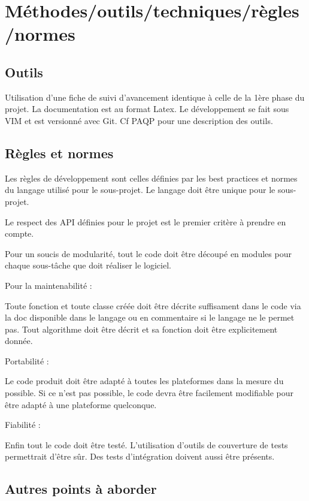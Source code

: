 \section{Méthodes/outils/techniques/règles/normes}

\subsection{Outils}
Utilisation d'une fiche de suivi d'avancement identique à celle de la 1ère 
phase du projet.
La documentation est au format Latex.
Le développement se fait sous VIM et est versionné avec Git.
Cf PAQP pour une description des outils.

\subsection{Règles et normes}
Les règles de développement sont celles définies par les best practices et 
normes du langage utilisé pour le sous-projet.
Le langage doit être unique pour le sous-projet.

Le respect des API définies pour le projet est le premier critère à prendre en 
compte.

Pour un soucis de modularité, tout le code doit être découpé en modules pour
chaque sous-tâche que doit réaliser le logiciel.

Pour la maintenabilité :

Toute fonction et toute classe créée doit être décrite suffisament dans le code 
via la doc disponible dans le langage ou en commentaire si le langage ne le
permet pas. 
Tout algorithme doit être décrit et sa fonction doit être explicitement donnée.

Portabilité :

Le code produit doit être adapté à toutes les plateformes dans la mesure du 
possible. Si ce n'est pas possible, le code devra être facilement modifiable 
pour être adapté à une plateforme quelconque.

Fiabilité :

Enfin tout le code doit être testé. L'utilisation d'outils de 
couverture de tests permettrait d'être sûr. 
Des tests d'intégration doivent aussi être présents.

\subsection{Autres points à aborder}


